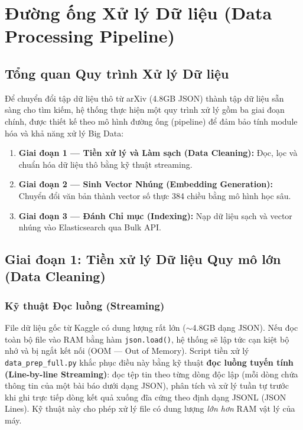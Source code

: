 \chapter{Đường ống Xử lý Dữ liệu (Data Processing Pipeline)}
\label{ch:data-pipeline}

\section{Tổng quan Quy trình Xử lý Dữ liệu}
Để chuyển đổi tập dữ liệu thô từ arXiv (4.8GB JSON) thành tập dữ liệu sẵn sàng cho tìm kiếm, hệ thống thực hiện một quy trình xử lý gồm ba giai đoạn chính, được thiết kế theo mô hình đường ống (pipeline) để đảm bảo tính module hóa và khả năng xử lý Big Data:

\begin{enumerate}
    \item \textbf{Giai đoạn 1 --- Tiền xử lý và Làm sạch (Data Cleaning):} Đọc, lọc và chuẩn hóa dữ liệu thô bằng kỹ thuật streaming.
    \item \textbf{Giai đoạn 2 --- Sinh Vector Nhúng (Embedding Generation):} Chuyển đổi văn bản thành vector số thực 384 chiều bằng mô hình học sâu.
    \item \textbf{Giai đoạn 3 --- Đánh Chỉ mục (Indexing):} Nạp dữ liệu sạch và vector nhúng vào Elasticsearch qua Bulk API.
\end{enumerate}

\section{Giai đoạn 1: Tiền xử lý Dữ liệu Quy mô lớn (Data Cleaning)}
\subsection{Kỹ thuật Đọc luồng (Streaming)}
File dữ liệu gốc từ Kaggle có dung lượng rất lớn ($\sim$4.8GB dạng JSON). Nếu đọc toàn bộ file vào RAM bằng hàm \texttt{json.load()}, hệ thống sẽ lập tức cạn kiệt bộ nhớ và bị ngắt kết nối (OOM --- Out of Memory). Script tiền xử lý \texttt{data\_prep\_full.py} khắc phục điều này bằng kỹ thuật \textbf{đọc luồng tuyến tính (Line-by-line Streaming)}: đọc tệp tin theo từng dòng độc lập (mỗi dòng chứa thông tin của một bài báo dưới dạng JSON), phân tích và xử lý tuần tự trước khi ghi trực tiếp dòng kết quả xuống đĩa cứng theo định dạng JSONL (JSON Lines). Kỹ thuật này cho phép xử lý file có dung lượng \textit{lớn hơn} RAM vật lý của máy.

